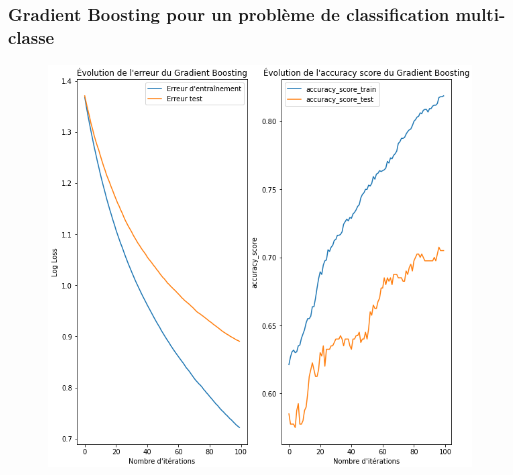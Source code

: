\documentclass{beamer}
\theoremstyle{definition}
\begin{document}
\begin{frame}
	\frametitle{Gradient Boosting pour un problème de classification multi-classe}
	
		\centering
	\begin{minipage}[c]{0.6\linewidth}\centering\begin{figure}
			
			\includegraphics[width=1\linewidth]{gpt_multiclasses.png}
			\caption*{}
			
	\end{figure}\end{minipage}
	
\end{frame}
\end{document}
